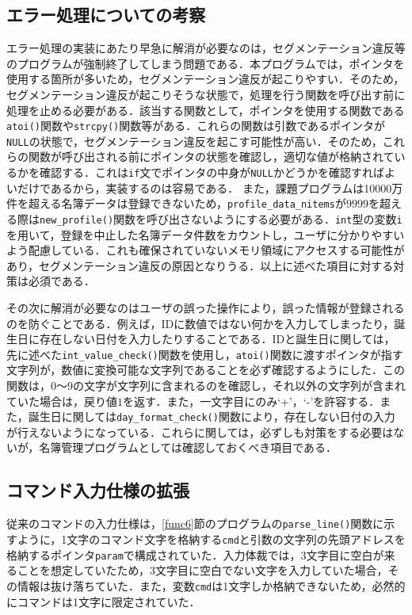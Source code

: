 \subsection{エラー処理についての考察}
エラー処理の実装にあたり早急に解消が必要なのは，セグメンテーション違反等のプログラムが強制終了してしまう問題である．本プログラムでは，ポインタを使用する箇所が多いため，セグメンテーション違反が起こりやすい．そのため，セグメンテーション違反が起こりそうな状態で，処理を行う関数を呼び出す前に処理を止める必要がある．該当する関数として，ポインタを使用する関数である\verb|atoi()|関数や\verb|strcpy()|関数等がある．これらの関数は引数であるポインタが\verb|NULL|の状態で，セグメンテーション違反を起こす可能性が高い．そのため，これらの関数が呼び出される前にポインタの状態を確認し，適切な値が格納されているかを確認する．これは\verb|if|文でポインタの中身が\verb|NULL|かどうかを確認すればよいだけであるから，実装するのは容易である．
また，課題プログラムは10000万件を超える名簿データは登録できないため，\verb|profile_data_nitems|が$9999$を超える際は\verb|new_profile()|関数を呼び出さないようにする必要がある．\verb|int|型の変数\verb|i|を用いて，登録を中止した名簿データ件数をカウントし，ユーザに分かりやすいよう配慮している．これも確保されていないメモリ領域にアクセスする可能性があり，セグメンテーション違反の原因となりうる．以上に述べた項目に対する対策は必須である．

その次に解消が必要なのはユーザの誤った操作により，誤った情報が登録されるのを防ぐことである．例えば，IDに数値ではない何かを入力してしまったり，誕生日に存在しない日付を入力したりすることである．IDと誕生日に関しては，先に述べた\verb|int_value_check()|関数を使用し，\verb|atoi()|関数に渡すポインタが指す文字列が，数値に変換可能な文字列であることを必ず確認するようにした．この関数は，$0$〜$9$の文字が文字列に含まれるのを確認し，それ以外の文字列が含まれていた場合は，戻り値$1$を返す．また，一文字目にのみ‘+’，‘-’を許容する．また，誕生日に関しては\verb|day_format_check()|関数により，存在しない日付の入力が行えないようになっている．これらに関しては，必ずしも対策をする必要はないが，名簿管理プログラムとしては確認しておくべき項目である．

\subsection{コマンド入力仕様の拡張}
従来のコマンドの入力仕様は，\ref{func6}節のプログラムの\verb|parse_line()|関数に示すように，1文字のコマンド文字を格納する\verb|cmd|と引数の文字列の先頭アドレスを格納するポインタ\verb|param|で構成されていた．入力体裁では，3文字目に空白が来ることを想定していたため，3文字目に空白でない文字を入力していた場合，その情報は抜け落ちていた．また，変数\verb|cmd|は1文字しか格納できないため，必然的にコマンドは1文字に限定されていた．

